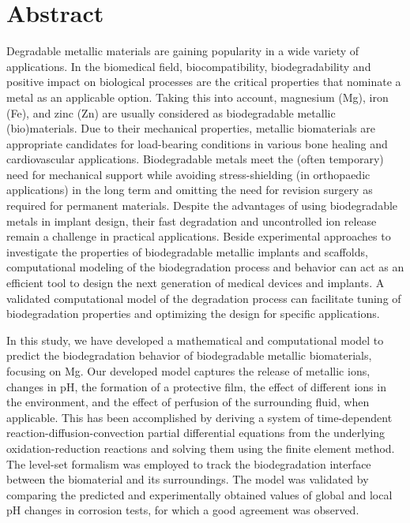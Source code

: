 \chapter{Abstract}                                 \label{ch:abstract}

Degradable metallic materials are gaining popularity in a wide variety of applications. In the biomedical field, biocompatibility, biodegradability and positive impact on biological processes are the critical properties that nominate a metal as an applicable option. Taking this into account, magnesium (Mg), iron (Fe), and zinc (Zn) are usually considered as biodegradable metallic (bio)materials. Due to their mechanical properties, metallic biomaterials are appropriate candidates for load-bearing conditions in various bone healing and cardiovascular applications. Biodegradable metals meet the (often temporary) need for mechanical support while avoiding stress-shielding (in orthopaedic applications) in the long term and omitting the need for revision surgery as required for permanent materials.  Despite the advantages of using biodegradable metals in implant design, their fast degradation and uncontrolled ion release remain a challenge in practical applications. Beside experimental approaches to investigate the properties of biodegradable metallic implants and scaffolds, computational modeling of the biodegradation process and behavior can act as an efficient tool to design the next generation of medical devices and implants. A validated computational model of the degradation process can facilitate tuning of biodegradation properties and optimizing the design for specific applications. 

In this study, we have developed a mathematical and computational model to predict the biodegradation behavior of biodegradable metallic biomaterials, focusing on Mg. Our developed model captures the release of metallic ions, changes in pH, the formation of a protective film, the effect of different ions in the environment, and the effect of perfusion of the surrounding fluid, when applicable. This has been accomplished by deriving a system of time-dependent reaction-diffusion-convection partial differential equations from the underlying oxidation-reduction reactions and solving them using the finite element method. The level-set formalism was employed to track the biodegradation interface between the biomaterial and its surroundings. The model was validated by comparing the predicted and experimentally obtained values of global and local pH changes in corrosion tests, for which a good agreement was observed. 

